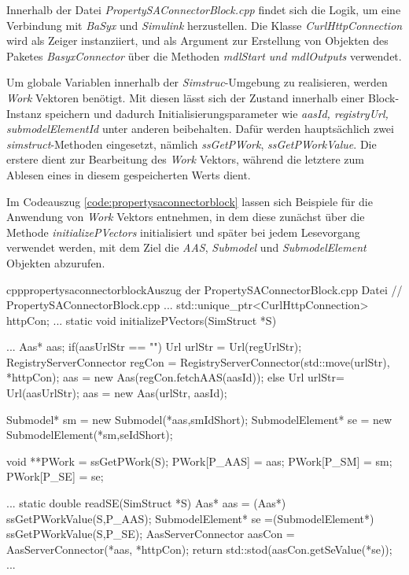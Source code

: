 Innerhalb der Datei \textit{PropertySAConnectorBlock.cpp} findet sich die Logik, um eine Verbindung mit \textit{BaSyx} und \textit{Simulink} herzustellen. Die Klasse \textit{CurlHttpConnection} wird als Zeiger instanziiert, und als Argument zur Erstellung von Objekten des Paketes \textit{BasyxConnector} über die Methoden \textit{mdlStart und mdlOutputs} verwendet. 


Um globale Variablen innerhalb der \textit{Simstruc}-Umgebung zu realisieren, werden \textit{Work} Vektoren benötigt. Mit diesen lässt sich der Zustand innerhalb einer Block-Instanz speichern und dadurch Initialisierungsparameter wie \textit{aasId, registryUrl, submodelElementId} unter anderen beibehalten.
Dafür werden hauptsächlich zwei \textit{simstruct}-Methoden eingesetzt, nämlich \textit{ssGetPWork}, \textit{ssGetPWorkValue}. Die erstere dient zur Bearbeitung des \textit{Work} Vektors, während die letztere zum Ablesen eines in diesem gespeicherten Werts dient.

Im Codeauszug \ref{code:propertysaconnectorblock} lassen sich Beispiele für die Anwendung von \textit{Work} Vektors entnehmen, in dem diese zunächst über die Methode \textit{initializePVectors} initialisiert und später bei jedem Lesevorgang verwendet werden, mit dem Ziel die \textit{AAS}, \textit{Submodel} und \textit{SubmodelElement} Objekten abzurufen. 

\begin{codeblock}{cpp}{propertysaconnectorblock}{Auszug der PropertySAConnectorBlock.cpp Datei}
// PropertySAConnectorBlock.cpp
...
std::unique_ptr<CurlHttpConnection> httpCon;
...
static void initializePVectors(SimStruct *S)
{
    ...
    Aas* aas;
    if(aasUrlStr == ""){
      Url urlStr = Url(regUrlStr);
      RegistryServerConnector regCon = RegistryServerConnector(std::move(urlStr), *httpCon);
      aas = new Aas(regCon.fetchAAS(aasId));
    }else{
      Url urlStr= Url(aasUrlStr);
      aas = new Aas(urlStr, aasId);
    }
  
    Submodel* sm = new Submodel(*aas,smIdShort);
    SubmodelElement* se = new SubmodelElement(*sm,seIdShort);
  
    void **PWork = ssGetPWork(S);
    PWork[P_AAS] = aas;
    PWork[P_SM] = sm;
    PWork[P_SE] = se;
}
...
static double readSE(SimStruct *S){
  Aas* aas = (Aas*) ssGetPWorkValue(S,P_AAS);
  SubmodelElement* se =(SubmodelElement*) ssGetPWorkValue(S,P_SE);
  AasServerConnector aasCon = AasServerConnector(*aas, *httpCon);
  return  std::stod(aasCon.getSeValue(*se));
}
...
\end{codeblock}

